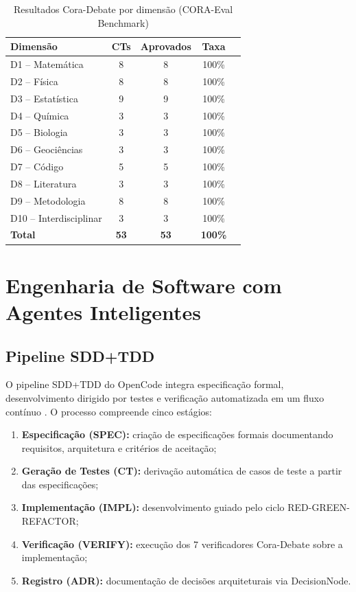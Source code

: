 \documentclass[12pt,a4paper,sumario=tradicional]{abntex2}
\begin{document}
\begin{table}[H]
\centering
\caption{Resultados Cora-Debate por dimensão (CORA-Eval Benchmark)}
\label{tab:cora-results}
\begin{tabular}{@{}lcccc@{}}
\toprule
\textbf{Dimensão} & \textbf{CTs} & \textbf{Aprovados} & \textbf{Taxa} \\
\midrule
D1 -- Matemática    & 8  & 8  & 100\% \\
D2 -- Física        & 8  & 8  & 100\% \\
D3 -- Estatística   & 9  & 9  & 100\% \\
D4 -- Química       & 3  & 3  & 100\% \\
D5 -- Biologia      & 3  & 3  & 100\% \\
D6 -- Geociências   & 3  & 3  & 100\% \\
D7 -- Código        & 5  & 5  & 100\% \\
D8 -- Literatura    & 3  & 3  & 100\% \\
D9 -- Metodologia   & 8  & 8  & 100\% \\
D10 -- Interdisciplinar & 3 & 3 & 100\% \\
\midrule
\textbf{Total}      & \textbf{53} & \textbf{53} & \textbf{100\%} \\
\bottomrule
\end{tabular}
\end{table}

\chapter{Engenharia de Software com Agentes Inteligentes}

\section{Pipeline SDD+TDD}

O pipeline SDD+TDD do OpenCode integra especificação formal, desenvolvimento dirigido por testes e verificação automatizada em um fluxo contínuo \cite{gomes2025sdscai}. O processo compreende cinco estágios:

\begin{enumerate}
    \item \textbf{Especificação (SPEC):} criação de especificações formais documentando requisitos, arquitetura e critérios de aceitação;
    \item \textbf{Geração de Testes (CT):} derivação automática de casos de teste a partir das especificações;
    \item \textbf{Implementação (IMPL):} desenvolvimento guiado pelo ciclo RED-GREEN-REFACTOR;
    \item \textbf{Verificação (VERIFY):} execução dos 7 verificadores Cora-Debate sobre a implementação;
    \item \textbf{Registro (ADR):} documentação de decisões arquiteturais via DecisionNode.
\end{enumerate}
\end{document}
